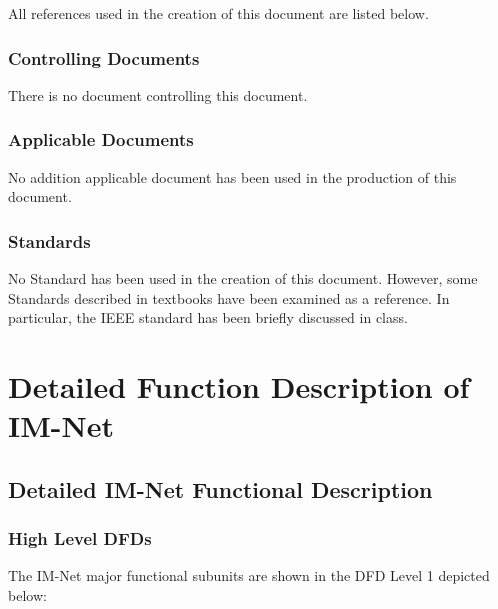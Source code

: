 \documentclass[letterpaper]{article}
\begin{document}
All references used in the creation of this document are listed below.

\subsubsection{Controlling Documents}

There is no document controlling this document.

\subsubsection{Applicable Documents}

No addition applicable document has been used in the production of this document.

\subsubsection{Standards}

No Standard has been used in the creation of this document. However, some Standards described in textbooks have been examined as a reference. In particular, the IEEE standard has been briefly discussed in class.

\eject

\section{Detailed Function Description of IM-Net}

\subsection{Detailed IM-Net Functional Description}

\subsubsection{High Level DFDs}

The IM-Net major functional subunits are shown in the DFD Level 1 depicted below:
\end{document}
